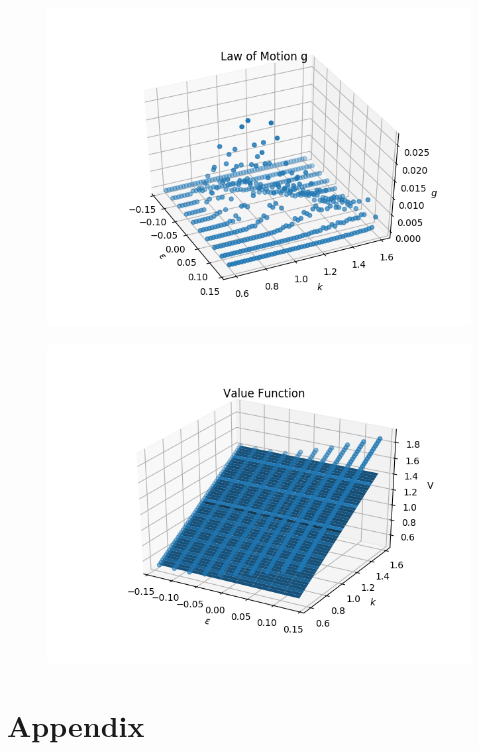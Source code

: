 \documentclass[]{article}
\begin{document}
\begin{figure}[H]
	\centering
	\includegraphics[scale=0.5]{Figures/Vf-7}
	\label{figure:1}
\end{figure}

\begin{figure}[H]
	\centering
	\includegraphics[scale=0.5]{Figures/Vf-8}
	\label{figure:1}
\end{figure}

\newpage

\section{Appendix}{\label{Appendix}}
	

\newpage


\end{document}
